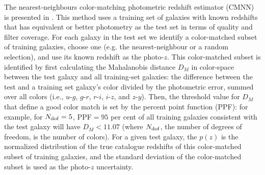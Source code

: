 \documentclass[usenatbib]{mn2e}
\begin{document}
The nearest-neighbours color-matching photometric redshift estimator (\textsc{CMNN}) is presented in \cite[][herafter G18]{Graham:17}. This method uses a training set of galaxies with known redshifts that has equivalent or better photometry as the test set in terms of quality and filter coverage. For each galaxy in the test set we identify a color-matched subset of training galaxies, choose one (e.g. the nearest-neighbour or a random selection), and use its known redshift as the photo-$z$. This color-matched subset is identified by first calculating the Mahalanobis distance $D_M$ in color-space between the test galaxy and all training-set galaxies: the difference between the test and a training set galaxy's color divided by the photometric error, summed over all colors (i.e., $u$-$g$, $g$-$r$, $r$-$i$, $i$-$z$, and $z$-$y$). Then, the threshold value for $D_M$ that define a good color match is set by the percent point function (PPF): for example, for $N_{\rm dof}=5$, PPF$=95$ per cent of all training galaxies consistent with the test galaxy will have $D_M < 11.07$ (where $N_{\rm dof}$, the number of degrees of freedom, is the number of colors). For a given test galaxy, the $p(z)$ is the normalized distribution of the true catalogue redshifts of this color-matched subset of training galaxies, and the standard deviation of the color-matched subset is used as the photo-$z$ uncertainty.
\end{document}
